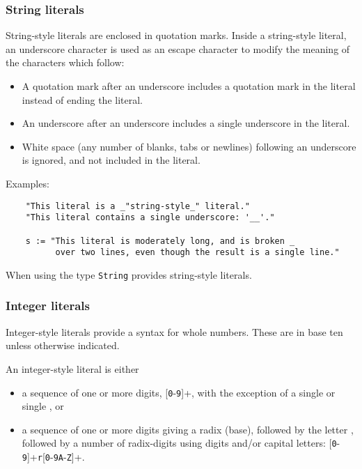 \subsubsection{String literals}

String-style literals are enclosed in quotation marks.
Inside a string-style literal, an underscore character \ttin{\_} is used
as an escape character to modify the meaning of the characters which follow:

\begin{itemize}
\item A quotation mark after an underscore includes a quotation mark
in the literal instead of ending the literal.
\item An underscore after an underscore includes a single underscore
in the literal.
\item White space (any number of blanks, tabs or newlines) following
an underscore is ignored, and not included in the literal.
\end{itemize}

Examples:

\begin{small}
\begin{verbatim}
    "This literal is a _"string-style_" literal."
    "This literal contains a single underscore: '__'."

    s := "This literal is moderately long, and is broken _
          over two lines, even though the result is a single line."
\end{verbatim}
\end{small}

When using \libaldor{}
the type \verb"String" provides string-style literals.

\subsubsection{Integer literals}

Integer-style literals provide a syntax for whole numbers.
These are in base ten unless otherwise indicated.

An integer-style literal is either
\begin{itemize}
\item a sequence of one or more digits, [{\tt 0}-{\tt 9}]+, with the
      exception of a single  or single , or
\item a sequence of one or more digits giving a radix (base), followed
      by the letter , followed by a number of radix-digits using
      digits and/or capital letters:
            [{\tt 0}-{\tt 9}]+{\tt r}[{\tt 0}-{\tt 9A}-{\tt Z}]+.
\end{itemize}

